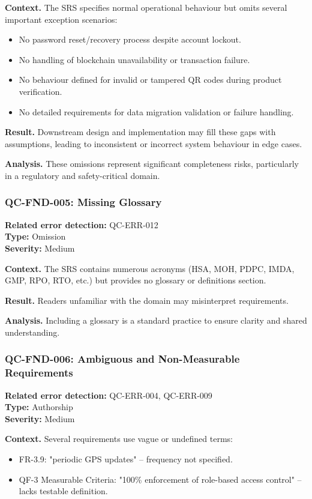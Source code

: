 \documentclass[11pt,a4paper]{article}
\begin{document}
\textbf{Context.} The SRS specifies normal operational behaviour but omits several important exception scenarios:
\begin{itemize}
\item No password reset/recovery process despite account lockout.
\item No handling of blockchain unavailability or transaction failure.
\item No behaviour defined for invalid or tampered QR codes during product verification.
\item No detailed requirements for data migration validation or failure handling.
\end{itemize}

\textbf{Result.} Downstream design and implementation may fill these gaps with assumptions, leading to inconsistent or incorrect system behaviour in edge cases.

\textbf{Analysis.} These omissions represent significant completeness risks, particularly in a regulatory and safety-critical domain.

\subsubsection*{QC-FND-005: Missing Glossary}
\textbf{Related error detection:} QC-ERR-012 \\
\textbf{Type:} Omission \\
\textbf{Severity:} Medium

\textbf{Context.} The SRS contains numerous acronyms (HSA, MOH, PDPC, IMDA, GMP, RPO, RTO, etc.) but provides no glossary or definitions section.

\textbf{Result.} Readers unfamiliar with the domain may misinterpret requirements.

\textbf{Analysis.} Including a glossary is a standard practice to ensure clarity and shared understanding.

\subsubsection*{QC-FND-006: Ambiguous and Non-Measurable Requirements}
\textbf{Related error detection:} QC-ERR-004, QC-ERR-009 \\
\textbf{Type:} Authorship \\
\textbf{Severity:} Medium

\textbf{Context.} Several requirements use vague or undefined terms:
\begin{itemize}
\item FR-3.9: "periodic GPS updates" -- frequency not specified.
\item QF-3 Measurable Criteria: "100\% enforcement of role-based access control" -- lacks testable definition.
\end{itemize}
\end{document}
